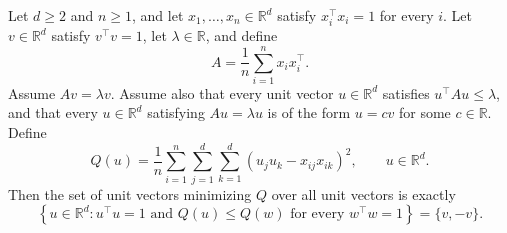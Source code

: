 \begin{theorem}
Let $d\ge2$ and $n\ge1$, and let $x_1,\ldots,x_n\in\mathbb R^d$ satisfy
$x_i^\top x_i=1$ for every $i$.  Let $v\in\mathbb R^d$ satisfy
$v^\top v=1$, let $\lambda\in\mathbb R$, and define
\[
  A=\frac1n\sum_{i=1}^n x_i x_i^\top.
\]
Assume $Av=\lambda v$.  Assume also that every unit vector
$u\in\mathbb R^d$ satisfies $u^\top Au\le\lambda$, and that every
$u\in\mathbb R^d$ satisfying $Au=\lambda u$ is of the form $u=cv$ for
some $c\in\mathbb R$.  Define
\[
 Q(u)=\frac1n\sum_{i=1}^n\sum_{j=1}^d\sum_{k=1}^d
       (u_ju_k-x_{ij}x_{ik})^2,
 \qquad u\in\mathbb R^d.
\]
Then the set of unit vectors minimizing $Q$ over all unit vectors is exactly
\[
 \left\{u\in\mathbb R^d:u^\top u=1
   \text{ and }Q(u)\le Q(w)\text{ for every }w^\top w=1\right\}
 =\{v,-v\}.
\]
\end{theorem}
